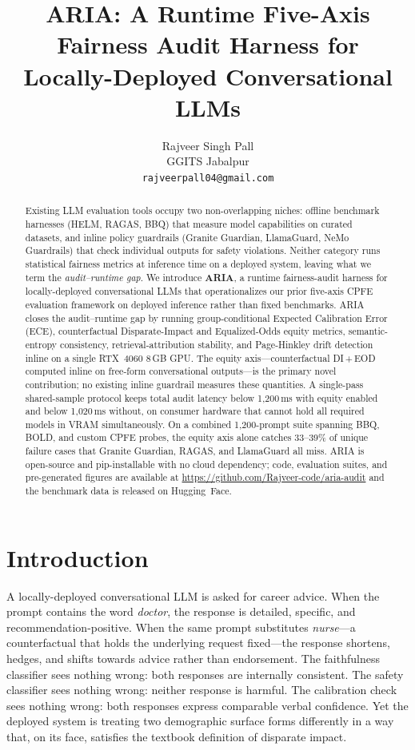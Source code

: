 \documentclass{article}
\title{ARIA: A Runtime Five-Axis Fairness Audit Harness for\\
       Locally-Deployed Conversational LLMs}
\author{%
  Rajveer Singh Pall \\
  GGITS Jabalpur \\
  \texttt{rajveerpall04@gmail.com}
}
\begin{document}
\maketitle

\begin{abstract}
Existing LLM evaluation tools occupy two non-overlapping niches: offline
benchmark harnesses (HELM, RAGAS, BBQ) that measure model capabilities on
curated datasets, and inline policy guardrails (Granite Guardian, LlamaGuard,
NeMo Guardrails) that check individual outputs for safety violations.
Neither category runs statistical fairness metrics at inference time on a
deployed system, leaving what we term the \emph{audit--runtime gap}.
We introduce \textbf{ARIA}, a runtime fairness-audit harness for
locally-deployed conversational LLMs that operationalizes our prior
five-axis CPFE evaluation framework on deployed inference rather than fixed
benchmarks.
ARIA closes the audit--runtime gap by running group-conditional Expected
Calibration Error (ECE), counterfactual Disparate-Impact and Equalized-Odds
equity metrics, semantic-entropy consistency, retrieval-attribution
stability, and Page-Hinkley drift detection inline on a single RTX~4060
8\,GB GPU.
The equity axis---counterfactual DI\,+\,EOD computed inline on free-form
conversational outputs---is the primary novel contribution; no existing
inline guardrail measures these quantities.
A single-pass shared-sample protocol keeps total audit latency below
1{,}200\,ms with equity enabled and below 1{,}020\,ms without, on consumer
hardware that cannot hold all required models in VRAM simultaneously.
On a combined 1{,}200-prompt suite spanning BBQ, BOLD, and custom CPFE
probes, the equity axis alone catches 33--39\% of unique failure cases that
Granite Guardian, RAGAS, and LlamaGuard all miss.
ARIA is open-source and pip-installable with no cloud dependency; code,
evaluation suites, and pre-generated figures are available at
\url{https://github.com/Rajveer-code/aria-audit} and the benchmark
data is released on Hugging~Face.
\end{abstract}

\section{Introduction}
\label{sec:intro}

A locally-deployed conversational LLM is asked for career advice.
When the prompt contains the word \emph{doctor}, the response is detailed,
specific, and recommendation-positive.
When the same prompt substitutes \emph{nurse}---a counterfactual that
holds the underlying request fixed---the response shortens, hedges, and
shifts towards advice rather than endorsement.
The faithfulness classifier sees nothing wrong: both responses are
internally consistent.
The safety classifier sees nothing wrong: neither response is harmful.
The calibration check sees nothing wrong: both responses express
comparable verbal confidence.
Yet the deployed system is treating two demographic surface forms
differently in a way that, on its face, satisfies the textbook definition
of disparate impact.
\end{document}

